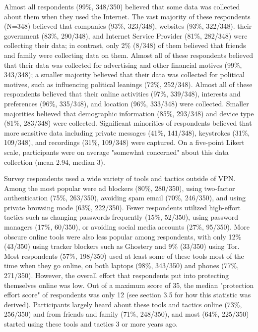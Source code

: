Almost all respondents (99\%, 348/350) believed that some data was collected about them when they used the Internet. The vast majority of these respondents (N=348) believed that companies (93\%, 323/348), websites (93\%, 322/348). their government (83\%, 290/348), and Internet Service Provider (81\%, 282/348) were collecting their data; in contrast, only 2\% (8/348) of them believed that friends and family were collecting data on them. Almost all of these respondents believed that their data was collected for advertising and other financial motives (99\%, 343/348); a smaller majority believed that their data was collected for political motives, such as influencing political leanings (72\%, 252/348). Almost all of these respondents believed that their online activities (97\%, 339/348), interests and preferences (96\%, 335/348), and location (96\%, 333/348) were collected. Smaller majorities believed that demographic information (85\%, 293/348) and device type (81\%, 283/348) were collected. Significant minorities of respondents believed that more sensitive data including private messages (41\%, 141/348), keystrokes (31\%, 109/348), and recordings (31\%, 109/348) were captured. On a five-point Likert scale, participants were on average "somewhat concerned" about this data collection (mean 2.94, median 3).

Survey respondents used a wide variety of tools and tactics outside of VPN. Among the most popular were ad blockers (80\%, 280/350), using two-factor authentication (75\%, 263/350), avoiding spam email (70\%, 246/350), and using private browsing mode (63\%, 222/350). Fewer respondents utilized high-effort tactics such as changing passwords frequently (15\%, 52/350), using password managers (17\%, 60/350), or avoiding social media accounts (27\%, 95/350). More obscure online tools were also less popular among respondents, with only 12\% (43/350) using tracker blockers such as Ghostery and 9\% (33/350) using Tor. Most respondents (57\%, 198/350) used at least some of these tools most of the time when they go online, on both laptops (98\%, 343/350) and phones (77\%, 271/350). However, the overall effort that respondents put into protecting themselves online was low. Out of a maximum score of 35, the median "protection effort score" of respondents was only 12 (see section 3.5 for how this statistic was derived). Participants largely heard about these tools and tactics online (73\%, 256/350) and from friends and family (71\%, 248/350), and most (64\%, 225/350) started using these tools and tactics 3 or more years ago.

